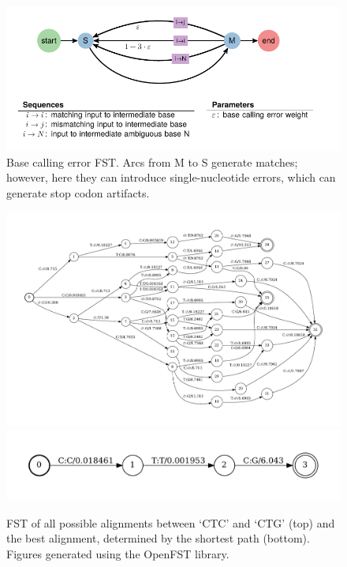 \documentclass[
]{article}
\begin{document}
\newpage

\begin{figure}
\centering
\includegraphics{figures/fig-base-calling-error.pdf}
\caption{\label{fig:figs} Base calling error FST. Arcs from M to S
generate matches; however, here they can introduce single-nucleotide
errors, which can generate stop codon artifacts.}
\end{figure}

\begin{figure}

{\centering \includegraphics{figures/aln-example-graph} \includegraphics{figures/aln-example} 

}

\caption{\label{fig:aln-example} FST of all possible alignments between `CTC' and `CTG' (top) and the best alignment, determined by the shortest path (bottom). Figures generated using the OpenFST library.}\label{fig:aln-example}
\end{figure}
\end{document}
